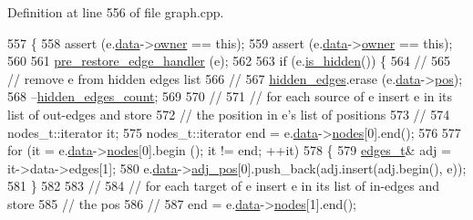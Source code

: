 Definition at line 556 of file graph.\+cpp.


\begin{DoxyCode}
557 \{
558     assert (e.\mbox{\hyperlink{classedge_a0ebb6dfa28b77f47529085049352b436}{data}}->\mbox{\hyperlink{classedge__data_a00436f2956a69cd9dc8e5bfa530e0ce9}{owner}} == \textcolor{keyword}{this});
559     assert (e.\mbox{\hyperlink{classedge_a0ebb6dfa28b77f47529085049352b436}{data}}->\mbox{\hyperlink{classedge__data_a00436f2956a69cd9dc8e5bfa530e0ce9}{owner}} == \textcolor{keyword}{this});
560 
561     \mbox{\hyperlink{classgraph_a569d227d9f4914278a143d52139e3303}{pre\_restore\_edge\_handler}} (e);
562 
563     \textcolor{keywordflow}{if} (e.\mbox{\hyperlink{classedge_ab6d6192a90b1cb77ce9dee2de78d9743}{is\_hidden}}()) \{
564     \textcolor{comment}{//}
565     \textcolor{comment}{// remove e from hidden edges list}
566     \textcolor{comment}{//}
567     \mbox{\hyperlink{classgraph_a0d3da33d047ba7cdc3dc68b5d9c84b88}{hidden\_edges}}.erase (e.\mbox{\hyperlink{classedge_a0ebb6dfa28b77f47529085049352b436}{data}}->\mbox{\hyperlink{classedge__data_a178a8fd40a6ec8139291f96a7807f711}{pos}});
568     --\mbox{\hyperlink{classgraph_a3151f544e049fbd985204ca9d8f74c97}{hidden\_edges\_count}};
569 
570     \textcolor{comment}{//}
571     \textcolor{comment}{// for each source of e insert e in its list of out-edges and store}
572     \textcolor{comment}{// the position in e's list of positions}
573     \textcolor{comment}{//}
574     nodes\_t::iterator it;
575     nodes\_t::iterator end = e.\mbox{\hyperlink{classedge_a0ebb6dfa28b77f47529085049352b436}{data}}->\mbox{\hyperlink{classedge__data_a870bbbb05de6c5f63d434db624c55dd4}{nodes}}[0].end();
576 
577     \textcolor{keywordflow}{for} (it = e.\mbox{\hyperlink{classedge_a0ebb6dfa28b77f47529085049352b436}{data}}->\mbox{\hyperlink{classedge__data_a870bbbb05de6c5f63d434db624c55dd4}{nodes}}[0].begin (); it != end; ++it)
578     \{
579         \mbox{\hyperlink{edge_8h_a8f9587479bda6cf612c103494b3858e3}{edges\_t}}& adj = it->data->edges[1];
580         e.\mbox{\hyperlink{classedge_a0ebb6dfa28b77f47529085049352b436}{data}}->\mbox{\hyperlink{classedge__data_aa325caa449576727df8042bad875bf43}{adj\_pos}}[0].push\_back(adj.insert(adj.begin(), e));
581     \}
582 
583     \textcolor{comment}{//}
584     \textcolor{comment}{// for each target of e insert e in its list of in-edges and store }
585     \textcolor{comment}{// the pos}
586     \textcolor{comment}{//}
587     end = e.\mbox{\hyperlink{classedge_a0ebb6dfa28b77f47529085049352b436}{data}}->\mbox{\hyperlink{classedge__data_a870bbbb05de6c5f63d434db624c55dd4}{nodes}}[1].end();

\end{DoxyCode}
